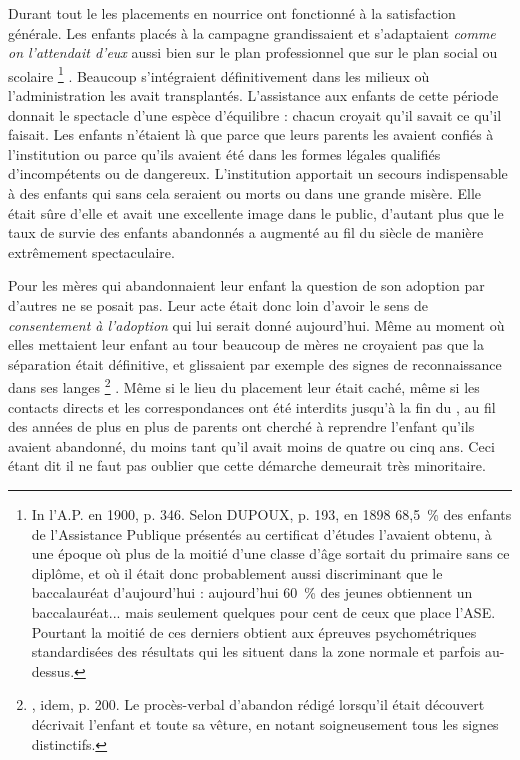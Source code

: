  Durant tout le  les placements en nourrice ont fonctionné à la satisfaction générale. Les enfants placés à la campagne grandissaient et s'adaptaient \emph{comme on l'attendait d'eux} aussi bien sur le plan professionnel que sur le plan social ou scolaire%
\footnote{In l'A.P. en 1900, p. 346. Selon DUPOUX, p. 193, en 1898 68,5~\% des enfants de l'Assistance Publique présentés au certificat d'études l'avaient obtenu, à une époque où plus de la moitié d'une classe d'âge sortait du primaire sans ce diplôme, et où il était donc probablement aussi discriminant que le baccalauréat d'aujourd'hui : aujourd'hui 60~\% des jeunes obtiennent un baccalauréat... mais seulement quelques pour cent de ceux que place l'ASE. Pourtant la moitié de ces derniers obtient aux épreuves psychométriques standardisées des résultats qui les situent dans la zone normale et parfois au-dessus.}%
. Beaucoup s'intégraient définitivement dans les milieux où l'administration les avait transplantés. L'assistance aux enfants de cette période donnait le spectacle d'une espèce d'équilibre : chacun croyait qu'il savait ce qu'il faisait. Les enfants n'étaient là que parce que leurs parents les avaient confiés à l'institution ou parce qu'ils avaient été dans les formes légales qualifiés d'incompétents ou de dangereux. L'institution apportait un secours indispensable à des enfants qui sans cela seraient ou morts ou dans une grande misère. Elle était sûre d'elle et avait une excellente image dans le public, d'autant plus que le taux de survie des enfants abandonnés a augmenté au fil du siècle de manière extrêmement spectaculaire.

 Pour les mères qui abandonnaient leur enfant la question de son adoption par d'autres ne se posait pas. Leur acte était donc loin d'avoir le sens de \emph{consentement à l'adoption} qui lui serait donné aujourd'hui. Même au moment où elles mettaient leur enfant au tour beaucoup de mères ne croyaient pas que la séparation était définitive, et glissaient par exemple des signes de reconnaissance dans ses langes%
\footnote{, idem, p. 200. Le procès-verbal d'abandon rédigé lorsqu'il était découvert décrivait l'enfant et toute sa vêture, en notant soigneusement tous les signes distinctifs.}%
. Même si le lieu du placement leur était caché, même si les contacts directs et les correspondances ont été interdits jusqu'à la fin du , au fil des années de plus en plus de parents ont cherché à reprendre l'enfant qu'ils avaient abandonné, du moins tant qu'il avait moins de quatre ou cinq ans. Ceci étant dit il ne faut pas oublier que cette démarche demeurait très minoritaire.



